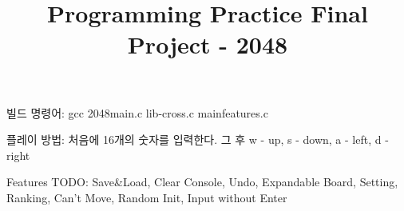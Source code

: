 \documentclass[a4paper, 11pt]{article}
\author{}
\date{}
\title{Programming Practice Final Project - 2048}
\begin{document}
    \begin{titlepage}
        \maketitle
        \tableofcontents
        \newpage
    \end{titlepage}    
    빌드 명령어: gcc 2048main.c lib-cross.c mainfeatures.c

    플레이 방법: 처음에 16개의 숫자를 입력한다.
    그 후 w - up, s - down, a - left, d - right

    Features TODO: Save\&Load, Clear Console, Undo, Expandable Board, Setting, Ranking, Can't Move, Random Init, Input without Enter
    
\end{document}
